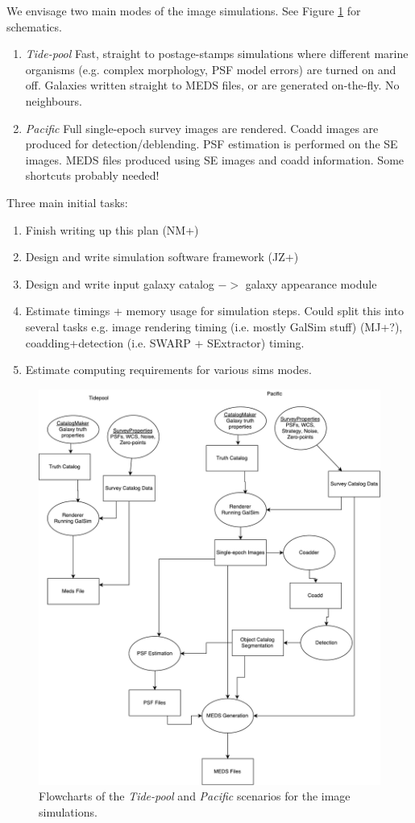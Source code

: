 \documentclass[\docopts]{\docclass}
\begin{document}
We envisage two main modes of the image simulations. See Figure \ref{figure: flowchart} for schematics.
\begin{enumerate}
\item \emph{Tide-pool} Fast, straight to postage-stamps simulations where different marine organisms (e.g. complex morphology, PSF model errors) are turned on and off. Galaxies written straight to MEDS files, or are generated on-the-fly. No neighbours.
\item \emph{Pacific} Full single-epoch survey images are rendered. Coadd images are produced for detection/deblending. PSF estimation is performed on the SE images. MEDS files produced using SE images and coadd information. Some shortcuts probably needed!
\end{enumerate}

Three main initial tasks:
\begin{enumerate}
\item{Finish writing up this plan (NM+)}
\item{Design and write simulation software framework (JZ+)}
\item{Design and write input galaxy catalog 
$->$ galaxy appearance module}
\item{Estimate timings + memory usage for simulation steps. Could split this into several tasks e.g. image rendering timing (i.e. mostly GalSim stuff) (MJ+?), coadding+detection (i.e. SWARP + SExtractor) timing.}
\item{Estimate computing requirements for various sims modes.}
\end{enumerate}



\begin{figure}[h]
\includegraphics[width=0.9\columnwidth]{figures/flowchart.pdf}
\caption{Flowcharts of the \emph{Tide-pool} and \emph{Pacific} scenarios for the image simulations.}
\label{figure: flowchart}
\end{figure}
\end{document}
